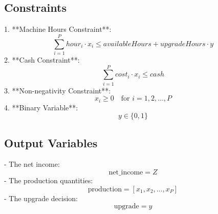\documentclass{article}
\begin{document}
\subsection*{Constraints}
1. **Machine Hours Constraint**:
\[
\sum_{i=1}^{P} hour_i \cdot x_i \leq availableHours + upgradeHours \cdot y
\]
2. **Cash Constraint**:
\[
\sum_{i=1}^{P} cost_i \cdot x_i \leq cash
\]
3. **Non-negativity Constraint**:
\[
x_i \geq 0 \quad \text{for } i = 1, 2, \ldots, P
\]
4. **Binary Variable**:
\[
y \in \{0, 1\}
\]

\subsection*{Output Variables}
- The net income:
\[
\text{net\_income} = Z
\]
- The production quantities:
\[
\text{production} = [x_1, x_2, \ldots, x_P]
\]
- The upgrade decision:
\[
\text{upgrade} = y
\]
\end{document}
